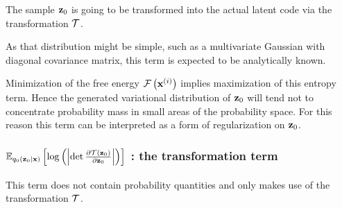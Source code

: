 The sample $\mathbf{z}_0$ is going to be transformed into
the actual latent code via the transformation $\mathcal{T}$.

As that distribution might be simple,
such as a multivariate Gaussian with diagonal covariance
matrix, this term is expected to be analytically known.

Minimization of the free energy $\mathcal{F}\left({\mathbf{x}^{(i)}}\right)$ implies
maximization of this entropy term. 
Hence the generated variational distribution of $\mathbf{z}_0$
will tend not to concentrate probability mass
in small areas of the probability space.
For this reason this term can be interpreted as
a form of regularization on $\mathbf{z}_0$.

\subsubsection{$\mathbb{E}_{q_0\left(\mathbf{z}_0|\mathbf{x}\right)}\left[ \log \left( \left|\det \frac{\partial \mathcal{T}\left(\mathbf{z}_0\right)}{\partial \mathbf{z}_0}\right| \right) \right]$ : the transformation term}

This term does not contain probability quantities and
only makes use of the transformation $\mathcal{T}$.

